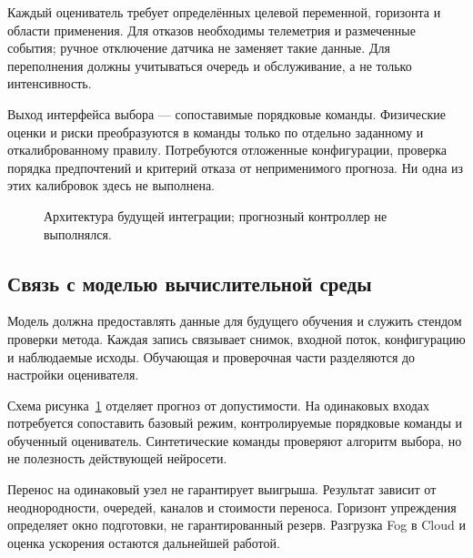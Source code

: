 Каждый оцениватель требует определённых целевой переменной, горизонта и области применения. Для отказов необходимы телеметрия и размеченные события; ручное отключение датчика не заменяет такие данные. Для переполнения должны учитываться очередь и обслуживание, а не только интенсивность.

Выход интерфейса выбора --- сопоставимые порядковые команды. Физические оценки и риски преобразуются в команды только по отдельно заданному и откалиброванному правилу. Потребуются отложенные конфигурации, проверка порядка предпочтений и критерий отказа от неприменимого прогноза. Ни одна из этих калибровок здесь не выполнена.

\begin{figure}[htbp]\centering
{}
\caption{Архитектура будущей интеграции; прогнозный контроллер не выполнялся.}\label{fig:placement}
\end{figure}

\subsection{Связь с моделью вычислительной среды}
Модель должна предоставлять данные для будущего обучения и служить стендом проверки метода. Каждая запись связывает снимок, входной поток, конфигурацию и наблюдаемые исходы. Обучающая и проверочная части разделяются до настройки оценивателя.

Схема рисунка~\ref{fig:placement} отделяет прогноз от допустимости. На одинаковых входах потребуется сопоставить базовый режим, контролируемые порядковые команды и обученный оцениватель. Синтетические команды проверяют алгоритм выбора, но не полезность действующей нейросети.

Перенос на одинаковый узел не гарантирует выигрыша. Результат зависит от неоднородности, очередей, каналов и стоимости переноса. Горизонт упреждения определяет окно подготовки, не гарантированный резерв. Разгрузка Fog в Cloud и оценка ускорения остаются дальнейшей работой.
